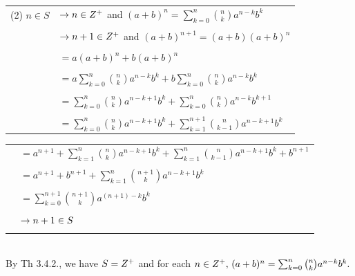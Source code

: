 \begin{large}
\begin{tabular}{r l}
(2) $n\in S$&$\to n\in Z^{+}$ and $(a + b)^{n} = \sum_{k=0}^{n}\binom{n}{k}a^{n-k}b^{k} $\\
&\\
&$\to n+1\in Z^{+}$ and $(a+b)^{n+1} = (a+b)(a+b)^{n} $ \\
&\\
&$= a(a+b)^{n}  +b(a+b)^{n}$\\
&\\
&$= a\sum_{k=0}^{n}\binom{n}{k}a^{n-k}b^{k} +b\sum_{k=0}^{n}\binom{n}{k}a^{n-k}b^{k}$\\
&\\
&$=\sum_{k=0}^{n}\binom{n}{k}a^{n-k+1}b^{k} + \sum_{k=0}^{n}\binom{n}{k}a^{n-k}b^{k+1}$\\
&\\
&$= \sum_{k=0}^{n}\binom{n}{k}a^{n-k+1}b^{k} + \sum_{k=1}^{n+1}\binom{n}{k-1}a^{n-k+1}b^{k}$\\
\end{tabular}

\newpage
\begin{tabular}{r l}
&$= a^{n+1} + \sum_{k=1}^{n} \binom{n}{k} a^{n-k+1}b^{k} + \sum_{k=1}^{n} \binom{n}{k-1} a^{n-k+1}b^{k} + b^{n+1}$\\
&\\
\hspace{20pt}& $= a^{n+1} + b^{n+1}+\sum_{k=1}^{n}\binom{n+1}{k}a^{n-k+1}b^{k}$\\
&\\
\hspace{20pt}&$= \sum_{k=0}^{n+1}\binom{n+1}{k}a^{(n+1) - k}b^{k}$\\
&\\
\hspace{20pt}&$\to n+1 \in S$ \\
&\\
\end{tabular}\\

By Th 3.4.2., we have $S = Z^{+}$ and for each $n\in Z^{+},\, (a + b)^{n} = \sum_{k=0}^{n}\binom{n}{k}a^{n-k}b^{k}.$ \nl


\end{large}
